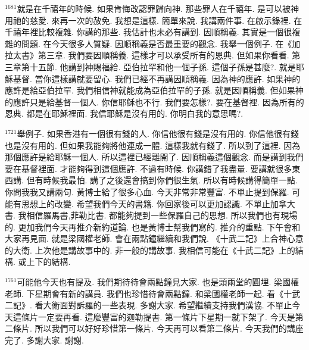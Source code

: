 \documentclass{book}
\begin{document}
$^{1681}$就是在千禧年的時候.
如果肯悔改認罪歸向神.
那些罪人在千禧年.
是可以被神用祂的慈愛.
來再一次的赦免.
我想是這樣.
簡單來說.
我講兩件事.
在啟示錄裡.
在千禧年裡比較複雜.
你講的那些.
我估計也未必有講到.
因順稱義.
其實是一個很複雜的問題.
在今天很多人質疑.
因順稱義是否最重要的觀念.
我舉一個例子.
在《加拉太書》第三章.
我們要因順稱義.
這樣才可以承受所有的恩典.
但如果你看看.
第三章第十五節.
他講到神賜福給.
亞伯拉罕和他一個子孫.
這個子孫是甚麼?.
就是耶穌基督.
當你這樣講就要留心.
我們已經不再講因順稱義.
因為神的應許.
如果神的應許是給亞伯拉罕.
我們相信神就能成為亞伯拉罕的子孫.
就是因順稱義.
但如果神的應許只是給基督一個人.
你信耶穌也不行.
我們要怎樣?.
要在基督裡.
因為所有的恩典.
都是在耶穌裡面.
我信耶穌是沒有用的.
你明白我的意思嗎?.

$^{1721}$舉例子.
如果香港有一個很有錢的人.
你信他很有錢是沒有用的.
你信他很有錢也是沒有用的.
但如果我能夠將他連成一體.
這樣我就有錢了.
所以到了這裡.
因為那個應許是給耶穌一個人.
所以這裡已經離開了.
因順稱義這個觀念.
而是講到我們要在基督裡面.
才能夠得到這個應許.
不過有時候.
你講錯了我盡量.
要講就很多東西講.
但有時候我最怕.
講了之後還會搞到你們很生氣.
所以有時候講得簡單一點.
你問我我又講兩句.
黃博士給了很多心血.
今天非常非常豐富.
不單止提到保羅.
可能有思想上的改變.
希望我們今天的書籍.
你回家後可以更加認識.
不單止加拿大書.
我相信羅馬書,菲勒比書.
都能夠提到一些保羅自己的思想.
所以我們也有現場的.
更加我們今天再推介新約道論.
也是黃博士幫我們寫的.
推介的重點.
下午會和大家再見面.
就是梁國權老師.
會在兩點鐘繼續和我們說.
《十武二記》上合神心意的大衛.
上次他是講故事中的.
非一般的講故事.
我相信可能在《十武二記》上的結構.
或上下的結構.

$^{1761}$可能他今天也有提及.
我們期待待會兩點鐘見大家.
也是頭兩堂的圓埋.
梁國權老師.
下星期會有新的講員.
我們也珍惜待會兩點鐘.
和梁國權老師一起.
看《十武二記》.
看大衛面對訴羅的一些表現.
多謝大家.
希望繼續支持我們漢協.
不單止今天這條片一定要再看.
這麼豐富的迦勒提書.
第一條片下星期一就下架了.
今天是第二條片.
所以我們可以好好珍惜第一條片.
今天再可以看第二條片.
今天我們的講座完了.
多謝大家.
謝謝.
\newpage
\end{document}
